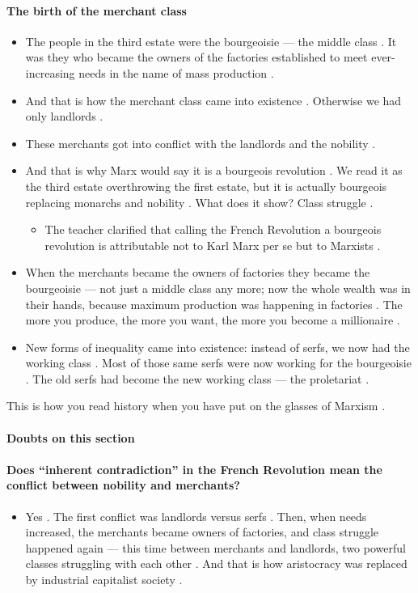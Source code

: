 \paragraph{The birth of the merchant class}
\begin{itemize}
    \item The people in the third estate were the bourgeoisie --- the middle class . It was they who became the owners of the factories established to meet ever-increasing needs in the name of mass production .
    \item And that is how the merchant class came into existence . Otherwise we had only landlords .
    \item These merchants got into conflict with the landlords and the nobility .
    \item And that is why Marx would say it is a bourgeois revolution . We read it as the third estate overthrowing the first estate, but it is actually bourgeois replacing monarchs and nobility . What does it show? Class struggle .
    \begin{itemize}
        \item The teacher clarified that calling the French Revolution a bourgeois revolution is attributable not to Karl Marx per se but to Marxists .
    \end{itemize}
    \item When the merchants became the owners of factories they became the bourgeoisie --- not just a middle class any more; now the whole wealth was in their hands, because maximum production was happening in factories . The more you produce, the more you want, the more you become a millionaire .
    \item New forms of inequality came into existence: instead of serfs, we now had the working class . Most of those same serfs were now working for the bourgeoisie . The old serfs had become the new working class --- the proletariat .
\end{itemize}

\begin{CriticalPoint}
This is how you read history when you have put on the glasses of Marxism .
\end{CriticalPoint}

\paragraph{Doubts on this section}

\paragraph{Does ``inherent contradiction'' in the French Revolution mean the conflict between nobility and merchants?}
\begin{itemize}
    \item Yes . The first conflict was landlords versus serfs . Then, when needs increased, the merchants became owners of factories, and class struggle happened again --- this time between merchants and landlords, two powerful classes struggling with each other . And that is how aristocracy was replaced by industrial capitalist society .
\end{itemize}

